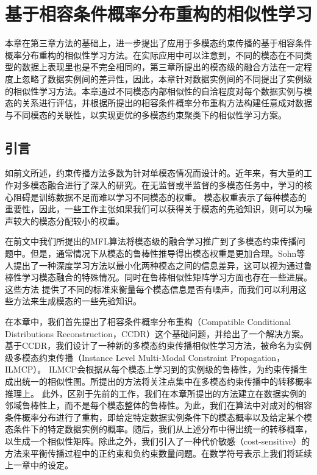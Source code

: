 \chapter{基于相容条件概率分布重构的相似性学习}
本章在第三章方法的基础上，进一步提出了应用于多模态约束传播的基于相容条件概率分布重构的相似性学习方法。在实际应用中可以注意到，不同的模态在不同类型的数据上表现里也是不完全相同的，第三章所提出的模态级的融合方法在一定程度上忽略了数据实例间的差异性，因此，本章针对数据实例间的不同提出了实例级的相似性学习方法。本章通过不同模态内部相似性的自洽程度对每个数据实例与模态的关系进行评估，并根据所提出的相容条件概率分布重构方法构建任意成对数据与不同模态的关联性，以实现更优的多模态约束聚类下的相似性学习方案。
\section{引言}
如前文所述，约束传播方法多数为针对单模态情况而设计的。近年来，有大量的工作对多模态融合进行了深入的研究\cite{lahat2015multimodal,poria2017ensemble,yu2017deep,poria2017review,liu2018weakly,kiela2018efficient}。在无监督或半监督的多模态任务中，学习的核心阻碍是训练数据不足而难以学习不同模态的权重。
模态权重表示了每种模态的重要性，因此，一些工作主张如果我们可以获得关于模态的先验知识，则可以为噪声较大的模态分配较小的权重\cite{kumar2011co,liu2013multi}。

在前文中我们所提出的MFL算法将模态级的融合学习推广到了多模态约束传播问题中。但是，通常情况下从模态的鲁棒性推导得出模态权重是更加合理。Sohn等人提出了一种深度学习方法以最小化两种模态之间的信息差异\cite{sohn2014improved}，这可以视为通过鲁棒性学习模态融合的特殊情况。同时在鲁棒相似性矩阵学习方面也存在一些进展\cite{pavan2007dominant,premachandran2013consensus,zhu2014constructing}。这些方法
提供了不同的标准来衡量每个模态信息是否有噪声，而我们可以利用这些方法来生成模态的一些先验知识。

在本章中，我们首先提出了相容条件概率分布重构（Compatible Conditional Distributions Reconstruction，CCDR）这个基础问题，并给出了一个解决方案。基于CCDR，我们设计了一种新的多模态约束传播相似性学习方法，被命名为实例级多模态约束传播（Instance Level Multi-Modal Constraint Propagation，ILMCP）。
ILMCP会根据从每个模态上学习到的实例级的鲁棒性，为约束传播生成出统一的相似性图。所提出的方法将关注点集中在多模态约束传播中的转移概率推理上。
此外，区别于先前的工作，我们在本章所提出的方法建立在数据实例的邻域鲁棒性上，而不是每个模态整体的鲁棒性。为此，我们在算法中对成对的相容条件概率分布进行了重构，即给定特定数据实例条件下的模态概率以及给定某个模态条件下的特定数据实例的概率。随后，我们从上述分布中得出统一的转移概率，以生成一个相似性矩阵。除此之外，我们引入了一种代价敏感（cost-sensitive）的方法来平衡传播过程中的正约束和负约束数量问题。在数学符号表示上我们将延续上一章中的设定。

